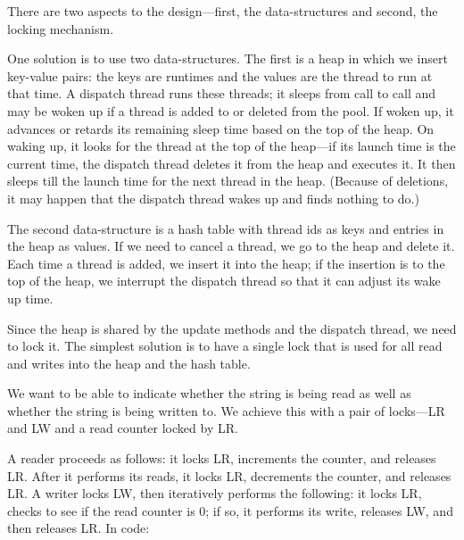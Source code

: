 There are two aspects to the design---first, the data-structures and second, the locking mechanism.

One solution is to use two data-structures.
The first is a heap in which we insert key-value pairs: the keys are runtimes and the values are the thread to run at that time.
A dispatch thread runs these threads; it sleeps from call
to call and may be woken up if a thread is added to or deleted
from the pool.  If woken up, it advances or retards its remaining
sleep time based on the top of the heap. 
On waking up, it looks for the thread at the top of the
heap---if its launch time is the current time, the dispatch thread
deletes it from the heap and executes it. It then sleeps till 
the launch time for the next thread in the heap. (Because of
deletions, it may happen that the dispatch thread wakes up and finds
nothing to do.)

The second data-structure is a hash table with thread ids as keys
and entries in the heap as values. If we need to cancel a thread,
we go to the heap and delete it.  Each time a thread is added,
we insert it into the heap; if the insertion
is to the top of the heap, we interrupt the dispatch thread
so that it can adjust its wake up time.

Since the heap is shared by the update methods and the dispatch thread,
we need to lock it. The simplest solution is to have a single lock
that is used for all read and writes into the heap and the hash table.

\begin{comment}
\ans{synchronization}
We can solve this by using two locks, $L$ and $M$.
We use $L$ to guard access to the number $n$ of outstanding tasks;
when a new task is launched it increments $n$ and 
when it completes, it decrements $n$ and waits on $M$ before
exiting.

When a thread decrements $n$ to $0$, it calls \texttt{notifyAll} 
on $M$---this wakes up all the threads waiting on $M$
who can now exit.

\end{comment}


We want to be able to indicate whether the string is being read 
as well as whether the string is being written to.  We achieve this
with a pair of locks---LR and LW and a read counter locked by LR. 

A reader proceeds as follows: it locks LR, increments the counter, and
releases LR.  After it performs its reads, it locks LR, decrements the counter, and releases LR.  
A writer locks LW, then iteratively performs the following: it locks LR, checks to see if the read counter is 0;
if so, it performs its write, releases LW, and then releases LR.
In code:



